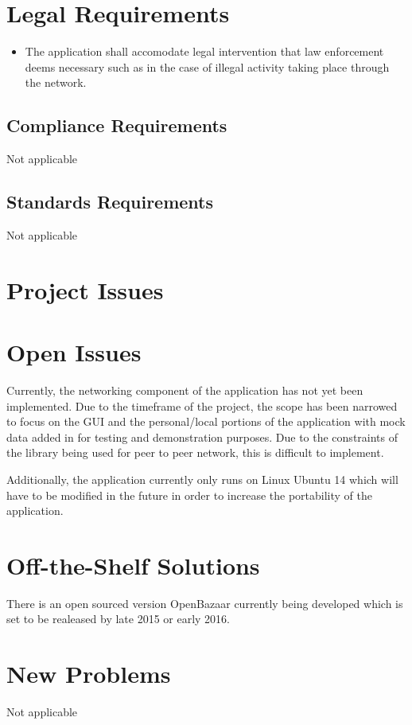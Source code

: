 \documentclass{article}
\begin{document}
\section{Legal Requirements}
\begin{itemize}
\item
The application shall accomodate legal intervention that law enforcement deems necessary such as in the case of illegal activity taking place through the network. 
\end{itemize}
\subsection{Compliance Requirements}
Not applicable

\subsection{Standards Requirements}
Not applicable

\section*{Project Issues}

\section{Open Issues}
Currently, the networking component of the application has not yet been implemented. Due to the timeframe of the project, the scope has been narrowed to focus on the GUI and the personal/local portions of the application with mock data added in for testing and demonstration purposes. Due to the constraints of the library being used for peer to peer network, this is difficult to implement.

Additionally, the application currently only runs on Linux Ubuntu 14 which will have to be modified in the future in order to increase the portability of the application. 

\section{Off-the-Shelf Solutions}
There is an open sourced version OpenBazaar currently being developed which is set to be realeased by late 2015 or early 2016. 
\section{New Problems}
Not applicable
\end{document}

